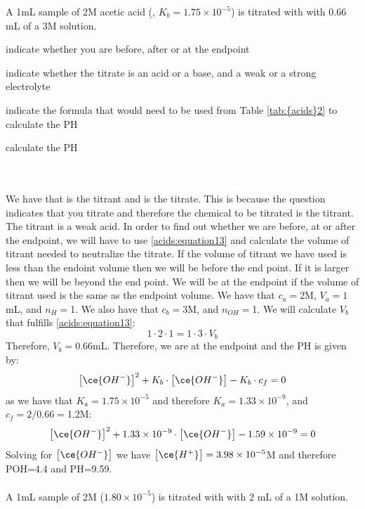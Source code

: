 \documentclass[main.tex]{subfiles}
\newcommand\chapterlabel{acids}
\begin{document}
\begin{description}
\begin{example} %
A 1mL sample of 2M acetic acid (, $K_b=1.75 \times 10^{-5}$) is titrated with with 0.66 mL of a  3M solution. \begin{inparaenum}[(a)] 
\item indicate whether you are before, after or at the endpoint
\item indicate whether the titrate is an acid or a base, and a weak or a strong electrolyte
\item indicate the formula that would need to be used from Table \ref{tab:{\chapterlabel}2} to calculate the PH 
\item calculate the PH
\end{inparaenum}
\\
\\
We have that  is the titrant and  is the titrate. This is because the question indicates that you titrate  and therefore the chemical to be titrated is the titrant. The titrant is a weak acid. In order to find out whether we are before, at or after the endpoint, we will have to use \ref{\chapterlabel:equation13} and calculate the volume of titrant needed to neutralize the titrate. If the volume of titrant we have used is less than the endoint volume then we will be before the end point. If it is larger then we will be beyond the end point. We will be at the endpoint if the volume of titrant used is the same as the endpoint volume. We have that $c_a=$2M, $V_a=1$mL, and $n_{H}=$1. We also have that $c_b=$3M, and $n_{OH}=$1. We will calculate $V_b$ that fulfills \ref{\chapterlabel:equation13}:
\[  1\cdot 2\cdot 1=1\cdot 3\cdot V_b \]
Therefore, $V_b=$0.66mL. Therefore, we are at the endpoint and the PH is given by:
\[  \big[ \ce{OH^-} \big]^2 +K_b\cdot \big[ \ce{OH^-} \big] -K_b\cdot c_f=0 \]
as we have that $K_a=1.75 \times 10^{-5}$ and therefore $K_a=1.33 \times 10^{-9}$, and $c_f=2/0.66=$1.2M:
\[  \big[ \ce{OH^-} \big]^2 +1.33\times 10^{-9}\cdot \big[ \ce{OH^-} \big] -1.59\times 10^{-9}=0 \]
Solving for $\big[ \ce{OH^-} \big]$ we have $\big[ \ce{H^+} \big]=3.98\times 10^{-5}$M and therefore POH=4.4 and PH=9.59.
\\
\faDiamond\ \\
A 1mL sample of 2M  ($1.80 \times 10^{-5}$) is titrated with with 2 mL of a  1M solution. \begin{inparaenum}[(a)] 

\end{inparaenum}
\end{example}
\end{description}
\end{document}
